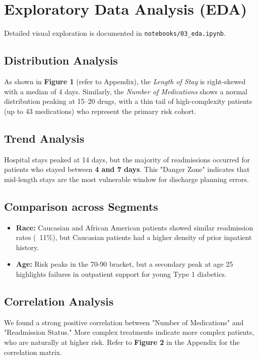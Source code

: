 \documentclass[12pt,a4paper]{article}
\begin{document}
\section{Exploratory Data Analysis (EDA)}
Detailed visual exploration is documented in \texttt{notebooks/03\_eda.ipynb}.

\subsection{Distribution Analysis}
As shown in \textbf{Figure 1} (refer to Appendix), the \textit{Length of Stay} is right-skewed with a median of 4 days. Similarly, the \textit{Number of Medications} shows a normal distribution peaking at 15–20 drugs, with a thin tail of high-complexity patients (up to 43 medications) who represent the primary risk cohort.

\subsection{Trend Analysis}
Hospital stays peaked at 14 days, but the majority of readmissions occurred for patients who stayed between \textbf{4 and 7 days}. This "Danger Zone" indicates that mid-length stays are the most vulnerable window for discharge planning errors.

\subsection{Comparison across Segments}
\begin{itemize}
    \item \textbf{Race:} Caucasian and African American patients showed similar readmission rates (~11\%), but Caucasian patients had a higher density of prior inpatient history.
    \item \textbf{Age:} Risk peaks in the 70-90 bracket, but a secondary peak at age 25 highlights failures in outpatient support for young Type 1 diabetics.
\end{itemize}

\subsection{Correlation Analysis}
We found a strong positive correlation between "Number of Medications" and "Readmission Status." More complex treatments indicate more complex patients, who are naturally at higher risk. Refer to \textbf{Figure 2} in the Appendix for the correlation matrix.
\end{document}
